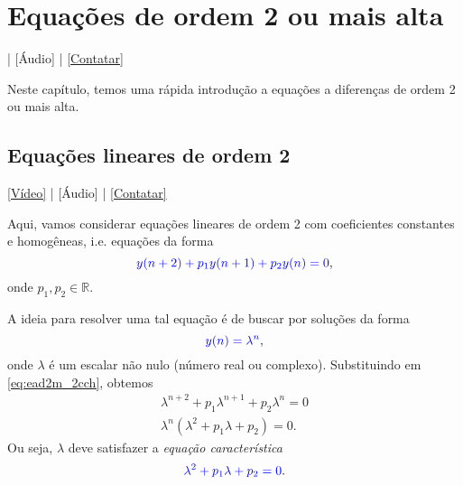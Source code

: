 
\chapter{Equações de ordem 2 ou mais alta}\label{cap_ead2m}

\begin{flushright}
  [Vídeo] | [Áudio] | \href{https://phkonzen.github.io/notas/contato.html}{[Contatar]}
\end{flushright}

Neste capítulo, temos uma rápida introdução a equações a diferenças de ordem 2 ou mais alta.

\section{Equações lineares de ordem 2}\label{cap_ead2m_sec_ead2lin}

\begin{flushright}
  \href{https://archive.org/details/ead-o2h}{[Vídeo]} | [Áudio] | \href{https://phkonzen.github.io/notas/contato.html}{[Contatar]}
\end{flushright}

Aqui, vamos considerar equações lineares de ordem 2 com coeficientes constantes e homogêneas, i.e. equações da forma
\begin{equation}\label{eq:ead2m_2cch}
  {\color{blue}y(n+2)+p_1y(n+1)+p_2y(n)=0},
\end{equation}
onde $p_1,p_2\in\mathbb{R}$.

A ideia para resolver uma tal equação é de buscar por soluções da forma
\begin{equation}
  {\color{blue}y(n)=\lambda^n},
\end{equation}
onde $\lambda$ é um escalar não nulo (número real ou complexo). Substituindo em \eqref{eq:ead2m_2cch}, obtemos
\begin{align}
  \lambda^{n+2}+p_1\lambda^{n+1} + p_2\lambda^n = 0\\
  \lambda^n\left(\lambda^{2}+p_1\lambda + p_2\right) = 0.
\end{align}
Ou seja, $\lambda$ deve satisfazer a \emph{equação característica}
\begin{equation}\label{eq:ead2m_2ec}
  {\color{blue}\lambda^{2}+p_1\lambda + p_2 = 0}.
\end{equation}

